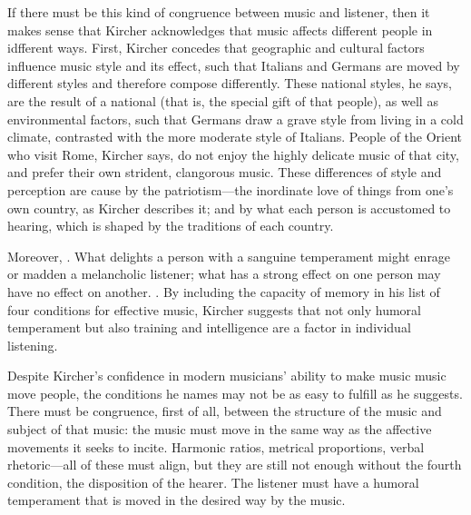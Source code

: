 If there must be this kind of congruence between music and listener, then it 
makes sense that Kircher acknowledges that music affects different people in 
idfferent ways.
First, Kircher concedes that geographic and cultural factors influence music 
style and its effect, such that Italians and Germans are moved by different 
styles and therefore compose differently.
These national styles, he says, are the result of a national  
(that is, the special gift of that people), as well as environmental factors, 
such that Germans draw a grave style from living in a cold climate, contrasted 
with the more moderate style of Italians.
People of the Orient who visit Rome, Kircher says, do not enjoy the highly 
delicate music of that city, and prefer their own strident, clangorous music.
These differences of style and perception are cause by the patriotism---the 
inordinate love of things from one's own country, as Kircher describes it; and 
by what each person is accustomed to hearing, which is shaped by the traditions 
of each country.%
    \Autocite[543--544]{Kircher:Musurgia} %

Moreover, .%
    \Autocite
    [544: .]
    {Kircher:Musurgia}
What delights a person with a sanguine temperament might enrage or madden a 
melancholic listener; what has a strong effect on one person may have no effect 
on another.%
    \Autocite[550]{Kircher:Musurgia}
.%
    \Autocite[550: .]
    {Kircher:Musurgia}
By including the capacity of memory in his list of four conditions for 
effective music, Kircher suggests that not only humoral temperament but also 
training and intelligence are a factor in individual listening.

Despite Kircher's confidence in modern musicians' ability to make music music 
move people, the conditions he names may not be as easy to fulfill as he 
suggests.
There must be congruence, first of all, between the structure of the music and 
subject of that music: the music must move in the same way as the affective 
movements it seeks to incite.
Harmonic ratios, metrical proportions, verbal rhetoric---all of these must 
align, but they are still not enough without the fourth condition, the 
disposition of the hearer.
The listener must have a humoral temperament that is moved in the desired way 
by the music. 

